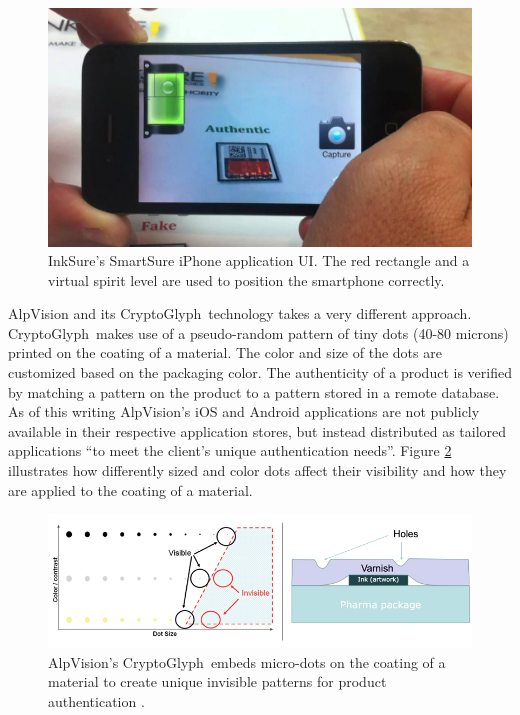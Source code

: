 \documentclass[thesis.tex]{subfiles}
\begin{document}
\begin{figure}[ht]
\centering \includegraphics[width=13.25cm]{images/existing_solutions/smartsure}
\caption{InkSure's SmartSure iPhone application UI. The red rectangle and a virtual spirit level are used to position the smartphone correctly. \cite{inksure} \label{figure:inksure}}
\end{figure}

AlpVision and its CryptoGlyph\textregistered\ technology takes a very different approach. CryptoGlyph\textregistered\ makes use of a pseudo-random pattern of tiny dots (40-80 microns) printed on the coating of a material. The color and size of the dots are customized based on the packaging color. The authenticity of a product is verified by matching a pattern on the product to a pattern stored in a remote database. As of this writing AlpVision's iOS and Android applications are not publicly available in their respective application stores, but instead distributed as tailored applications ``to meet the client's unique authentication needs''. Figure \ref{figure:alpvision} illustrates how differently sized and color dots affect their visibility and how they are applied to the coating of a material. \cite{alpvision}

\begin{figure}[hb]
\centering \includegraphics[width=\textwidth]{images/existing_solutions/cryptoglyph}
\caption{AlpVision's CryptoGlyph\textregistered\ embeds micro-dots on the coating of a material to create unique invisible patterns for product authentication \cite{alpvision}. \label{figure:alpvision}}
\end{figure}
\end{document}
